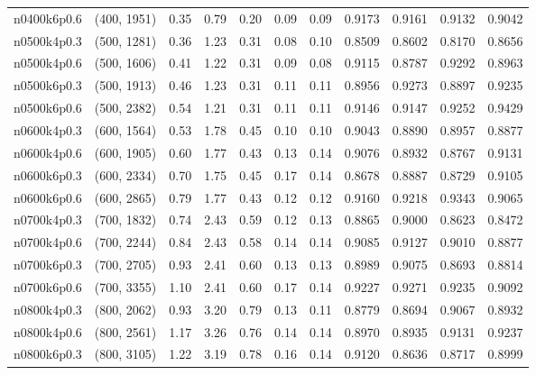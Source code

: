 \begin{tabular}{llrrrrrrrrr}
n0400k6p0.6 &   (400, 1951) &   0.35 &   0.79 &  0.20 &  0.09 &   0.09 &   0.9173 &   0.9161 &     0.9132 &      0.9042 \\
n0500k4p0.3 &   (500, 1281) &   0.36 &   1.23 &  0.31 &  0.08 &   0.10 &   0.8509 &   0.8602 &     0.8170 &      0.8656 \\
n0500k4p0.6 &   (500, 1606) &   0.41 &   1.22 &  0.31 &  0.09 &   0.08 &   0.9115 &   0.8787 &     0.9292 &      0.8963 \\
n0500k6p0.3 &   (500, 1913) &   0.46 &   1.23 &  0.31 &  0.11 &   0.11 &   0.8956 &   0.9273 &     0.8897 &      0.9235 \\
n0500k6p0.6 &   (500, 2382) &   0.54 &   1.21 &  0.31 &  0.11 &   0.11 &   0.9146 &   0.9147 &     0.9252 &      0.9429 \\
n0600k4p0.3 &   (600, 1564) &   0.53 &   1.78 &  0.45 &  0.10 &   0.10 &   0.9043 &   0.8890 &     0.8957 &      0.8877 \\
n0600k4p0.6 &   (600, 1905) &   0.60 &   1.77 &  0.43 &  0.13 &   0.14 &   0.9076 &   0.8932 &     0.8767 &      0.9131 \\
n0600k6p0.3 &   (600, 2334) &   0.70 &   1.75 &  0.45 &  0.17 &   0.14 &   0.8678 &   0.8887 &     0.8729 &      0.9105 \\
n0600k6p0.6 &   (600, 2865) &   0.79 &   1.77 &  0.43 &  0.12 &   0.12 &   0.9160 &   0.9218 &     0.9343 &      0.9065 \\
n0700k4p0.3 &   (700, 1832) &   0.74 &   2.43 &  0.59 &  0.12 &   0.13 &   0.8865 &   0.9000 &     0.8623 &      0.8472 \\
n0700k4p0.6 &   (700, 2244) &   0.84 &   2.43 &  0.58 &  0.14 &   0.14 &   0.9085 &   0.9127 &     0.9010 &      0.8877 \\
n0700k6p0.3 &   (700, 2705) &   0.93 &   2.41 &  0.60 &  0.13 &   0.13 &   0.8989 &   0.9075 &     0.8693 &      0.8814 \\
n0700k6p0.6 &   (700, 3355) &   1.10 &   2.41 &  0.60 &  0.17 &   0.14 &   0.9227 &   0.9271 &     0.9235 &      0.9092 \\
n0800k4p0.3 &   (800, 2062) &   0.93 &   3.20 &  0.79 &  0.13 &   0.11 &   0.8779 &   0.8694 &     0.9067 &      0.8932 \\
n0800k4p0.6 &   (800, 2561) &   1.17 &   3.26 &  0.76 &  0.14 &   0.14 &   0.8970 &   0.8935 &     0.9131 &      0.9237 \\
n0800k6p0.3 &   (800, 3105) &   1.22 &   3.19 &  0.78 &  0.16 &   0.14 &   0.9120 &   0.8636 &     0.8717 &      0.8999 \\

\end{tabular}
